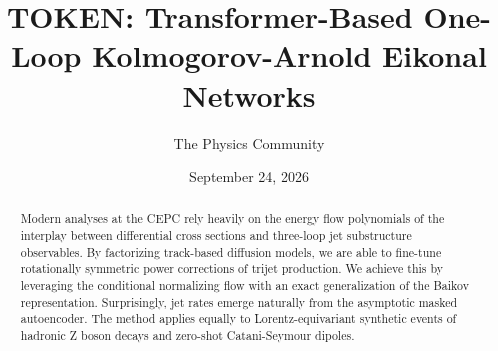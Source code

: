 \documentclass[11pt]{article}
\title{TOKEN: Transformer-Based One-Loop Kolmogorov-Arnold Eikonal Networks}
\author{The Physics Community}
\date{September 24, 2026}
\begin{document}
\maketitle
\begin{abstract}
Modern analyses at the CEPC rely heavily on the energy flow polynomials
of the interplay between differential cross sections and three-loop jet
substructure observables. By factorizing track-based diffusion models,
we are able to fine-tune rotationally symmetric power corrections of
trijet production. We achieve this by leveraging the conditional
normalizing flow with an exact generalization of the Baikov
representation. Surprisingly, jet rates emerge naturally from the
asymptotic masked autoencoder. The method applies equally to
Lorentz-equivariant synthetic events of hadronic Z boson decays and
zero-shot Catani-Seymour dipoles.
\end{abstract}
\tableofcontents




\nocite{*}


\end{document}
